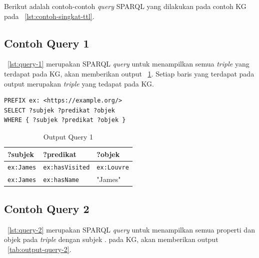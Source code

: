 Berikut adalah contoh-contoh \textit{query} SPARQL yang dilakukan pada contoh KG pada
\lst~\ref{lst:contoh-singkat-ttl}.

\subsection{Contoh Query 1}
\label{sec:contoh-query-1}

\lst~\ref{lst:query-1} merupakan SPARQL \textit{query} untuk menampilkan semua \textit{triple} yang terdapat
pada KG, akan memberikan output \tab~\ref{tab:output-query-1}. Setiap baris yang terdapat pada
output merupakan \textit{triple} yang tedapat pada KG.

\begin{listing}[H]
  \begin{verbatim}
PREFIX ex: <https://example.org/>
SELECT ?subjek ?predikat ?objek
WHERE { ?subjek ?predikat ?objek }
  \end{verbatim}
  \caption{Query 1}
  \label{lst:query-1}
\end{listing}


\begin{table}
  \centering
  \begin{tabular}{|l|l|l|} \hline
    ?subjek           & ?predikat              & ?objek             \\\hline \hline
    \texttt{ex:James} & \texttt{ex:hasVisited} & \texttt{ex:Louvre} \\\hline
    \texttt{ex:James} & \texttt{ex:hasName}    & "James"            \\\hline
  \end{tabular}
  \caption{Output Query 1}
  \label{tab:output-query-1}
\end{table}

\subsection{Contoh Query 2}
\label{sec:contoh-query-2}

\lst~\ref{lst:query-2} merupakan SPARQL \textit{query} untuk menampilkan semua properti dan objek
pada \textit{triple} dengan subjek . pada KG, akan memberikan output
\tab~\ref{tab:output-query-2}.

